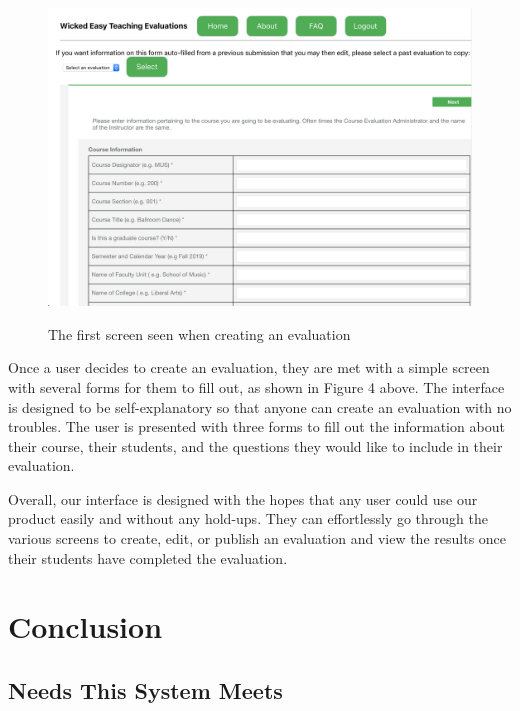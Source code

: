 \documentclass{article}
\begin{document}
\begin{center}
\begin{figure}[H]
  \centering
  {\includegraphics[width=6.2in]{images/final_create_screen.png}}
   \caption{The first screen seen when creating an evaluation}
\end{figure}
\end{center}

Once a user decides to create an evaluation, they are met with a simple screen with several forms for them to fill out, as shown in Figure 4 above. The interface is designed to be self-explanatory so that anyone can create an evaluation with no troubles. The user is presented with three forms to fill out the information about their course, their students, and the questions they would like to include in their evaluation.

Overall, our interface is designed with the hopes that any user could use our product easily and without any hold-ups. They can effortlessly go through the various screens to create, edit, or publish an evaluation and view the results once their students have completed the evaluation.

\newpage

\section{Conclusion}

\subsection{Needs This System Meets}
\end{document}
